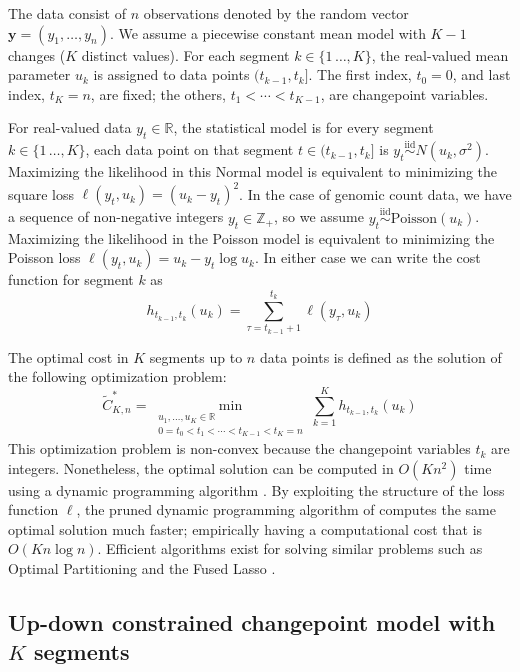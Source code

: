 \documentclass[twoside,11pt]{article}
\newcommand{\ZZ}{\mathbb Z}
\newcommand{\RR}{\mathbb R}
\begin{document}
The data consist of $n$ observations denoted by the random vector
$\mathbf y = (y_1, \dots, y_n)$. 
We assume a piecewise constant mean model with
$K-1$ changes ($K$ distinct values). For each segment
$k\in\{1\,\dots,K\}$, the real-valued mean parameter $u_k$ is assigned
to data points $(t_{k-1},t_k]$. The first index, $t_0=0$, and last
index, $t_K=n$, are fixed; the others, $t_1<\cdots<t_{K-1}$, are
changepoint variables. 

For real-valued data $y_t\in\RR$, the statistical model is for every
segment $k\in\{1\,\dots,K\}$, each data point on that segment
$t\in(t_{k-1},t_k]$ is
$y_t\stackrel{\text{iid}}{\sim}N(u_k,\sigma^2)$.  Maximizing the
likelihood in this Normal model is equivalent to minimizing the square
loss $\ell(y_t,u_k)=(u_k-y_t)^2$. In the case of genomic count data,
we have a sequence of non-negative integers $y_t\in\ZZ_+$, so we
assume $y_t\stackrel{\text{iid}}{\sim}\text{Poisson}(u_k)$.
Maximizing the likelihood in the Poisson model is equivalent to
minimizing the Poisson loss $\ell(y_t,u_k)=u_k-y_t\log u_k$. In either
case we can write the cost function for segment $k$ as
\begin{equation}
  \label{eq:h}
  h_{t_{k-1}, t_k}(u_k) = \sum_{\tau=t_{k-1}+1}^{t_k} \ell(y_\tau, u_k)
\end{equation}

The optimal cost in $K$ segments up to $n$ data points
is defined as the solution of the following optimization problem:
\begin{equation}
  \label{eq:segment-neighborhood}
\tilde{C}^*_{K,n} = \min_{\substack{
u_1,\dots, u_{K}\in\RR
\\
0=t_0<t_1<\cdots<t_{K-1}<t_K=n
}}
  \sum_{k=1}^K
h_{t_{k-1}, t_k}(u_k)
\end{equation}
This optimization problem is non-convex because the changepoint
variables $t_k$ are integers. Nonetheless, the optimal solution can be
computed in $O(K n^2)$ time using a dynamic programming algorithm
\citep{segment-neighborhood}. By exploiting the structure of the
loss function $\ell$, the pruned dynamic programming algorithm
of \citet{pruned-dp} computes the same optimal solution much faster;
empirically having a computational cost that is $O(K n \log n)$.
Efficient algorithms exist for solving similar problems such
as Optimal Partitioning
\citep{optimal-partitioning,phd-johnson,pelt,fpop} and the Fused Lasso
\citep{flsa}.


\subsection{Up-down constrained changepoint model with $K$ segments}
\end{document}

